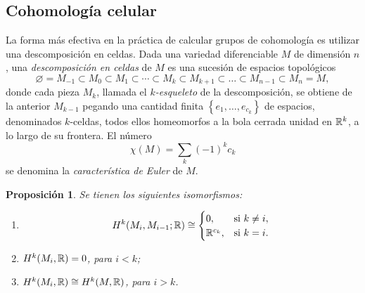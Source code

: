\documentclass[11pt,a4paper]{amsbook}
\newtheorem{prop}[subsection]{Proposición}
\theoremstyle{remark} \newtheorem{rmk}[subsection]{Observación}
\theoremstyle{definition} \newtheorem{defn}[subsection]{Definición}
\theoremstyle{definition} \newtheorem{ex}[subsection]{Ejemplo}
\theoremstyle{definition} \newtheorem{ej}[subsection]{Ejercicio}
\begin{document}
\subsection{Cohomología celular}
La forma más efectiva en la práctica de calcular grupos de cohomología es utilizar una descomposición en celdas. Dada una variedad diferenciable $M$ de dimensión $n$, una \emph{descomposición en celdas} de $M$ es una sucesión de espacios topológicos
\begin{equation*}
\varnothing = M_{-1} \subset M_0 \subset M_1 \subset \cdots \subset M_k \subset M_{k+1} \subset \dots \subset M_{n-1} \subset M_n=M,
\end{equation*}
donde cada pieza $M_k$, llamada el \emph{$k$-esqueleto} de la descomposición, se obtiene de la anterior $M_{k-1}$ pegando una cantidad finita $\left\{ e_1,\dots,e_{c_k} \right\}$ de espacios, denominados $k$-celdas, todos ellos homeomorfos a la bola cerrada unidad en $\mathbb R^k$, a lo largo de su frontera. El número
\begin{equation*}
\chi(M) = \sum_k (-1)^k c_k
\end{equation*}
se denomina la \emph{característica de Euler} de $M$.

\begin{prop}
  Se tienen los siguientes isomorfismos:
  \begin{enumerate}
\item
          \begin{equation*}
            H^k(M_i,M_{i-1};\mathbb R) \cong
            \begin{cases}
              0, & \text{si } k\neq i,\\
              \mathbb R^{c_k}, & \text{si } k=i.
            \end{cases}
          \end{equation*}
    \item $H^k(M_i,\mathbb R) = 0$, para $i< k$;
    \item $H^k(M_i,\mathbb R) \cong H^k(M,\mathbb R)$, para $i>k$.
  \end{enumerate}
\end{prop}
\end{document}
